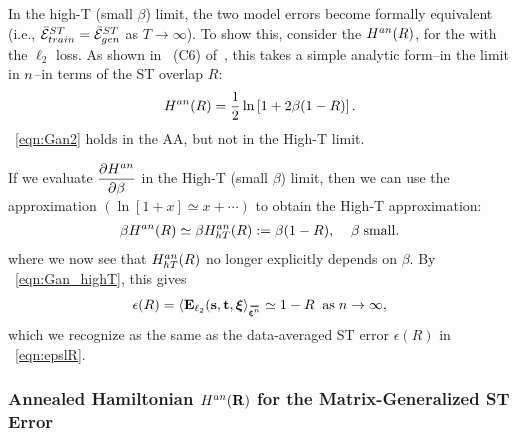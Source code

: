 



In the high-T (small $\beta$) limit, the two model errors become formally equivalent
(i.e., $\bar{\mathcal{E}}^{ST}_{train}=\bar{\mathcal{E}}^{ST}_{gen}$ as $T\rightarrow\infty$).
To show this, consider the \AnnealedHamiltonian $H^{an}(R)$, for the \LinearPerceptron with the $\ell_2$ loss. 
As shown in \EQN~(C6) of~\cite{SST92}, this takes a simple analytic form--in the \LargeN limit in $n$--in terms of the ST overlap $R$:
\begin{align}
\label{eqn:Gan2}
H^{an}(R) = \dfrac{1}{2}\ln\left[{1+2\beta(1-R)}\right]  .
\end{align}
\EQN~\ref{eqn:Gan2} holds in the AA, but not in the High-T limit.

If we evaluate $\dfrac{\partial H^{an}}{\partial \beta}$ in the High-T (small $\beta$) limit, 
then we can use the approximation $(\ln[1+x]\simeq x+\cdots)$ to obtain the High-T approximation:
\begin{align}
\label{eqn:Gan3}
\beta H^{an}(R) \simeq 
\beta H^{an}_{hT}(R):=\beta(1-R),\;\;\;\;\beta\;\text{small}  .
\end{align}
where we now see that $H^{an}_{hT}(R)$ no longer explicitly depends on $\beta$.
%
By \EQN~\ref{eqn:Gan_highT}, this gives 
\begin{align}
\label{eqn:Gan4}
\EPSL(R) =
\langle  \mathbf{E}_{\ell_2}(\SVEC,\TVEC,\XI \rangle_{\AVGNDXI} \simeq 1-R\;\;\text{as}\;\ND\rightarrow\infty  ,
\end{align}
which we recognize as the same as the data-averaged ST error $\epsilon(R)$ in \EQN~\ref{eqn:epslR}.


\subsubsection{Annealed Hamiltonian \texorpdfstring{$H^{an}(\mathbf{R})$}{H(R)} for the Matrix-Generalized ST Error}
\label{sxn:appendix_Gan}

